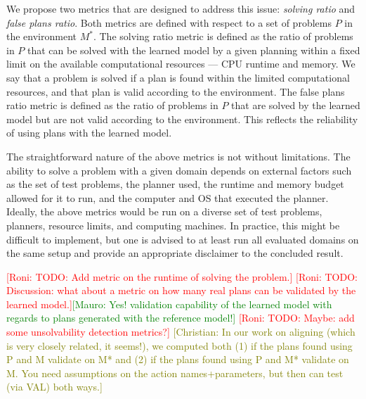 \documentclass{article}
\theoremstyle{definition}
\theoremstyle{remark}
\newcommand{\realm}{\ensuremath{M^*}\xspace}
\newcommand{\roni}[1]{{\textcolor{red}{[Roni: #1]}}}
\newcommand{\mauro}[1]{{\textcolor{green}{[Mauro: #1]}}}
\newcommand{\cm}[1]{{\textcolor{olive}{[Christian: #1]}}}
\begin{document}
We propose two metrics that are designed to address this issue: \emph{solving ratio} and \emph{false plans ratio}. 
Both metrics are defined with respect to a set of problems $P$ in the environment $\realm$. 
The solving ratio metric is defined as the ratio of problems in $P$ that can be solved with the learned model by a given planning within a fixed limit on the available computational resources --- CPU runtime and memory. 
We say that a problem is solved if a plan is found within the limited computational resources, and that plan is valid according to the environment. 
The false plans ratio metric is defined as the ratio of problems in $P$ that are solved by the learned model but are not valid according to the environment. This reflects the reliability of using plans with the learned model.


The straightforward nature of the above metrics is not without limitations. The ability to solve a problem with a given domain depends on external factors such as the set of test problems, the planner used, the runtime and memory budget allowed for it to run, and the computer and OS that executed the planner. Ideally, the above metrics would be run on a diverse set of test problems, planners, resource limits, and computing machines. In practice, this might be difficult to implement, but one is advised to at least run all evaluated domains on the same setup and provide an appropriate disclaimer to the concluded result. 

\roni{TODO: Add metric on the runtime of solving the problem.}
\roni{TODO: Discussion: what about a metric on how many real plans can be validated by the learned model.}\mauro{Yes! validation capability of the learned model with regards to plans generated with the reference model!}
\roni{TODO: Maybe: add some unsolvability detection metrics?}
\cm{In our work on aligning (which is very closely related, it seems!), we computed both (1) if the plans found using P and M validate on M* and (2) if the plans found using P and M* validate on M. You need assumptions on the action names+parameters, but then can test (via VAL) both ways.}



\end{document}
